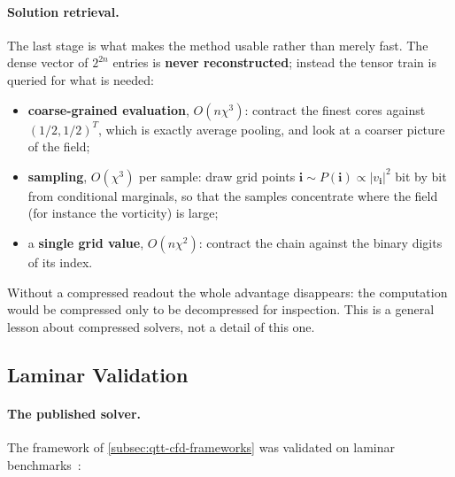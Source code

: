 \paragraph{Solution retrieval.}
The last stage is what makes the method usable rather than merely fast. The
dense vector of $2^{2n}$ entries is \textbf{never reconstructed}; instead the
tensor train is queried for what is needed:
\begin{itemize}
  \item \textbf{coarse-grained evaluation}, $O(n\chi^3)$: contract the finest
    cores against $(1/2, 1/2)^T$, which is exactly average pooling, and look at a
    coarser picture of the field;
  \item \textbf{sampling}, $O(\chi^3)$ per sample: draw grid points
    $\mathbf{i} \sim P(\mathbf{i}) \propto |v_{\mathbf{i}}|^2$ bit by bit from
    conditional marginals, so that the samples concentrate where the field (for
    instance the vorticity) is large;
  \item a \textbf{single grid value}, $O(n\chi^2)$: contract the chain against
    the binary digits of its index.
\end{itemize}
Without a compressed readout the whole advantage disappears: the computation
would be compressed only to be decompressed for inspection. This is a general
lesson about compressed solvers, not a detail of this one.

\subsection{Laminar Validation}
\label{subsec:qtt-cfd-results}

\paragraph{The published solver.}
The framework of \cref{subsec:qtt-cfd-frameworks} was validated on laminar
benchmarks~\cite{Peddinti2024}:

